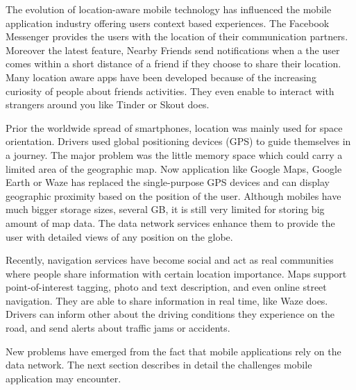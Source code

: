 The evolution of location-aware mobile technology has influenced the mobile
application industry offering users context based experiences. The Facebook
Messenger provides the users with the location of their communication partners.
Moreover the latest feature, Nearby Friends send notifications when a the user
comes within a short distance of a friend if they choose to share their
location. Many location aware apps have been developed because of the
increasing curiosity of people about friends activities. They even enable to
interact with strangers around you like Tinder or Skout does.

Prior the worldwide spread of smartphones, location was mainly used for space
orientation. Drivers used global positioning devices (GPS) to guide themselves
in a journey. The major problem was the little memory space which could carry a
limited area of the geographic map. Now application like Google Maps, Google
Earth or Waze has replaced the single-purpose GPS devices and can display
geographic proximity based on the position of the user. Although mobiles have
much bigger storage sizes, several GB, it is still very limited for storing big
amount of map data. The data network services enhance them to provide the user
with detailed views of any position on the globe.

Recently, navigation services have become social and act as real communities
where people share information with certain location importance. Maps support
point-of-interest tagging, photo and text description, and even online street
navigation. They are able to share information in real time, like
Waze does. Drivers can inform other about the driving conditions they experience
on the road, and send alerts about traffic jams or accidents.

New problems have emerged from the fact that mobile applications rely on the
data network. The next section describes in detail the challenges mobile
application may encounter.

